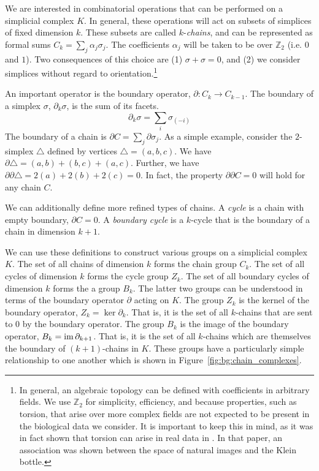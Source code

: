 We are interested in combinatorial operations that can be performed on a simplicial complex $K$.
In general, these operations will act on subsets of simplices of fixed dimension $k$.
These subsets are called $k$-\emph{chains}, and can be represented as formal sums $C_{k}=\sum_{j}\alpha_{j}\sigma_{j}$.
The coefficients $\alpha_j$ will be taken to be over $\mathbb{Z}_2$ (i.e. $0$ and $1$).
Two consequences of this choice are (1) $\sigma+\sigma=0$, and (2) we consider simplices without regard to orientation.\footnote{In general, an algebraic topology can be defined with coefficients in arbitrary fields. We use $\mathbb{Z}_2$ for simplicity, efficiency, and because properties, such as torsion, that arise over more complex fields are not expected to be present in the biological data we consider. It is important to keep this in mind, as it was in fact shown that torsion can arise in real data in \cite{Carlsson:2008up}. In that paper, an association was shown between the space of natural images and the Klein bottle.}

An important operator is the boundary operator, $\partial:C_{k}\rightarrow{C_{k-1}}$.
The boundary of a simplex $\sigma$, $\partial_{k}\sigma$, is the sum of its facets.
\begin{equation}
\partial_{k}\sigma = \sum_{i}{\sigma_{(-i)}}
\end{equation}
The boundary of a chain is $\partial C = \sum_{j}\partial\sigma_{j}$.
As a simple example, consider the $2$-simplex $\triangle$ defined by vertices $\triangle=(a,b,c)$.
We have $\partial\triangle = (a,b) + (b,c) + (a,c)$.
Further, we have $\partial\partial\triangle = 2(a) + 2(b) + 2(c) = 0$.
In fact, the property $\partial\partial C = 0$ will hold for any chain $C$.

We can additionally define more refined types of chains.
A \emph{cycle} is a chain with empty boundary, $\partial C=0$.
A \emph{boundary cycle} is a $k$-cycle that is the boundary of a chain in dimension $k+1$.

We can use these definitions to construct various groups on a simplicial complex $K$.
The set of all chains of dimension $k$ forms the chain group $C_{k}$.
The set of all cycles of dimension $k$ forms the cycle group $Z_{k}$.
The set of all boundary cycles of dimension $k$ forms the a group $B_{k}$.
The latter two groups can be understood in terms of the boundary operator $\partial$ acting on $K$.
The group $Z_{k}$ is the kernel of the boundary operator, $Z_{k}=\ker\partial_{k}$.
That is, it is the set of all $k$-chains that are sent to $0$ by the boundary operator.
The group $B_{k}$ is the image of the boundary operator, $B_{k}=\operatorname{im}\partial_{k+1}$.
That is, it is the set of all $k$-chains which are themselves the boundary of $(k+1)$-chains in $K$.
These groups have a particularly simple relationship to one another which is shown in Figure~\ref{fig:bg:chain_complexes}.

